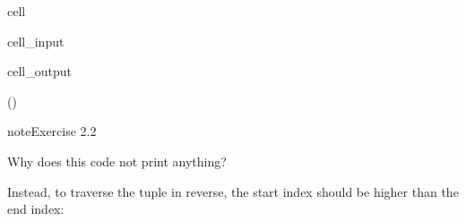 \documentclass[letterpaper,10pt,english]{jupyterBook}
\begin{document}
\begin{sphinxuseclass}{cell}\begin{sphinxVerbatimInput}

\begin{sphinxuseclass}{cell_input}
\begin{sphinxVerbatim}[commandchars=\\\{\}]
\PYG{p}{[}\PYG{p}{]}
\end{sphinxVerbatim}

\end{sphinxuseclass}\end{sphinxVerbatimInput}
\begin{sphinxVerbatimOutput}

\begin{sphinxuseclass}{cell_output}
\begin{sphinxVerbatim}[commandchars=\\\{\}]
()
\end{sphinxVerbatim}

\end{sphinxuseclass}\end{sphinxVerbatimOutput}

\end{sphinxuseclass}
\begin{sphinxadmonition}{note}{Exercise 2.2}

\sphinxAtStartPar
Why does this code not print anything?
\end{sphinxadmonition}

\sphinxAtStartPar
Instead, to traverse the tuple in reverse, the start index should be higher than the end index:
\end{document}
